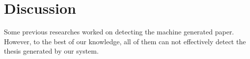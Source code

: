 \chapter{Discussion} \label{chapter:discussion}

Some previous researches\cite{M.Whatever} worked on detecting the machine generated paper. However, to the best of our knowledge, all of them can not effectively detect the thesis generated by our system.